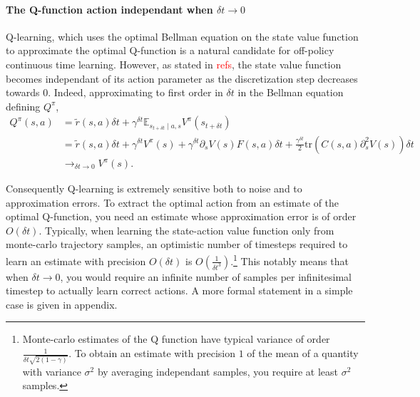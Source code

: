 \documentclass[11pt]{article}
\newcommand{\deltat}{{\delta t}}
\newcommand{\E}{\mathbb{E}}
\newcommand{\TODO}[1]{\textcolor{red}{#1}}
\newcommand{\bigO}[1]{O(#1)}
\begin{document}
\paragraph{The Q-function action independant when $\deltat \to 0$}
Q-learning, which uses the optimal Bellman equation on the state value function
to approximate the optimal Q-function is a natural candidate for off-policy
continuous time learning. However, as stated in \TODO{refs}, the state value function
becomes independant of its action parameter as the discretization step decreases towards
$0$. Indeed, approximating to first order in $\deltat$ in the Bellman equation defining
$Q^\pi$, 
\begin{align}
	Q^\pi(s, a) &= \tilde{r}(s, a)\deltat + \gamma^\deltat \E_{s_{t+\deltat} \mid a, s} 
	V^\pi(s_{t+\deltat})\nonumber\\
	&= \tilde{r}(s, a)\deltat + \gamma^\deltat V^\pi(s) + \gamma^\deltat \partial_s V(s) F(s, a) \deltat
	+ \frac{\gamma^\deltat}{2} \text{tr}\left(C(s, a)\partial^2_{s} V(s)\right) \deltat\nonumber\\
	&\to_{\deltat \to 0} V^\pi(s).
\end{align}

Consequently Q-learning is extremely sensitive both to noise and to approximation errors.
To extract the optimal action from an estimate of the optimal Q-function, you need an estimate
whose approximation error is of order $\bigO{\deltat}$.
Typically, when learning the state-action value function only from monte-carlo trajectory samples, 
an optimistic number of timesteps required to learn an estimate with precision $\bigO{\deltat}$ is
$\bigO{\frac{1}{\deltat^3}}$.\footnote{
	Monte-carlo estimates of the Q function have typical variance of order
	$\frac{1}{\deltat\sqrt{2(1 - \gamma)}}$. To obtain an estimate with precision $1$ of the mean
	of a quantity with variance $\sigma^2$ by averaging independant samples, you
	require at least $\sigma^2$ samples.}
This notably means that when $\deltat \to 0$, you would require an infinite number of samples
per infinitesimal timestep to actually learn correct actions. A more formal statement in a simple case
is given in appendix.
\end{document}
